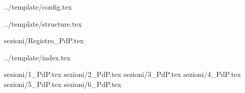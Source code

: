  {../template/config.tex}

\def\DOCUMENTO{Piano di Progetto}
\def\VERSIONE{1.0.0}

\def\DESCRIZIONE{<Info documento>}

\def\REDATTORE {Alberto Andriolo\\ & Francesco Bizzaro}
\def\VERIFICATORE {Riccardo Rizzo}
\def\RESPONSABILE {Enrico Chiara}

\def\USO {Esterno}

\def\DISTRIBUZIONE {\GRUPPO{}\\ & \COMMITTENTE{}\\}

\def\DESCRIZIONE {Documento riguardante la pianificazione del progetto \PROGETTO}


\def\INDICE	{true}
\def\TABELLE {true}
\def\FIGURE {true}


 {../template/structure.tex}

 {sezioni/Registro_PdP.tex}

 {../template/index.tex}


 {sezioni/1_PdP.tex}
 {sezioni/2_PdP.tex}
 {sezioni/3_PdP.tex}
 {sezioni/4_PdP.tex}
 {sezioni/5_PdP.tex}
 {sezioni/6_PdP.tex}





